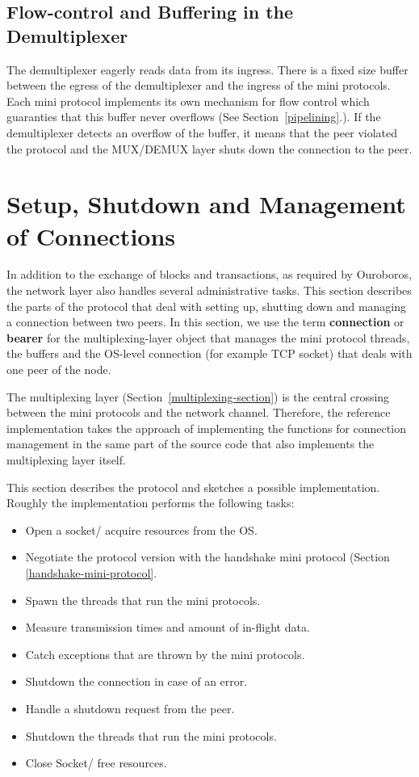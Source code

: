 \documentclass{report}
\newcommand{\hide}[1]{}
\theoremstyle{definition}{
  \newtheorem{lemma}{Lemma}[section] %
  \newtheorem{definition}[lemma]{Definition}
}
\theoremstyle{theorem}{
  \newtheorem{invariant}[lemma]{Invariant}
  \newtheorem{proofobligation}[lemma]{Proof Obligation}
}
\numberwithin{equation}{lemma}
\begin{document}
\subsection{Flow-control and Buffering in the Demultiplexer}
\label{mux-flow-control}
The demultiplexer eagerly reads data from its ingress.
There is a fixed size buffer between the egress of the demultiplexer and the ingress of
the mini protocols.
Each mini protocol implements its own mechanism for flow control which guaranties that this buffer
never overflows (See Section~\ref{pipelining}.).
If the demultiplexer detects an overflow of the buffer, it means that the peer violated the
protocol and the MUX/DEMUX layer shuts down the connection to the peer.

\hide{
The size of the buffers is listed in Table~\ref{demux-buffers}.
}

\section{Setup, Shutdown and Management of Connections}
\label{peer-setup-section}
In addition to the exchange of blocks and transactions, as required by Ouroboros,
the network layer also handles several administrative tasks.
This section describes the parts of the protocol that deal with setting up, shutting down and
managing a connection between two peers.
In this section, we use the term {\bf connection} or {\bf bearer} for the multiplexing-layer object
that manages the mini protocol threads, the buffers and the OS-level connection
(for example TCP socket) that deals with one peer of the node.

The multiplexing layer (Section~\ref{multiplexing-section}) is the central crossing between
the mini protocols and the network channel.
Therefore, the reference implementation takes the approach
of implementing the functions for connection management in the same part of the source code
that also implements the multiplexing layer itself.

This section describes the protocol and sketches a possible implementation.
Roughly the implementation performs the following tasks:
\begin{itemize}
\item Open a socket/ acquire resources from the OS.
\item Negotiate the protocol version with the handshake mini protocol
      (Section \ref{handshake-mini-protocol}.
\item Spawn the threads that run the mini protocols.
\item Measure transmission times and amount of in-flight data.
\item Catch exceptions that are thrown by the mini protocols.
\item Shutdown the connection in case of an error.
\item Handle a shutdown request from the peer.
\item Shutdown the threads that run the mini protocols.
\item Close Socket/ free resources.
\end{itemize}
\end{document}
